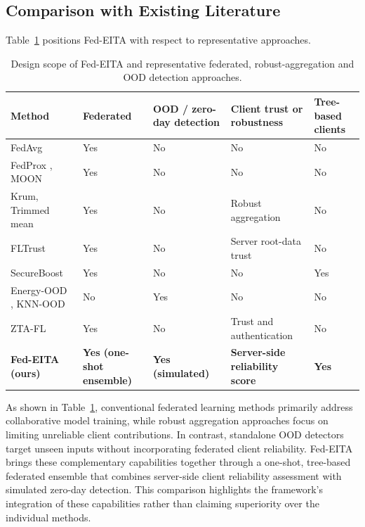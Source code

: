 \documentclass[pdflatex,sn-mathphys-num]{sn-jnl}
\begin{document}
{\subsection{Comparison with Existing Literature}
Table~\ref{tab:literature} positions Fed-EITA with respect to representative approaches. 

\begin{table}[!htbp]\centering
\color{black}
\caption{Design scope of Fed-EITA and representative federated, robust-aggregation and OOD detection approaches.}\label{tab:literature}
\footnotesize
\begin{tabular}{@{}>{\raggedright\arraybackslash}p{}>{\raggedright\arraybackslash}p{}>{\raggedright\arraybackslash}p{}>{\raggedright\arraybackslash}p{}>{\raggedright\arraybackslash}p{}@{}}\toprule
Method & Federated & OOD / zero-day detection & Client trust or robustness & Tree-based clients \\ \midrule
FedAvg \cite{mcmahan2017fedavg} & Yes & No & No & No \\
FedProx \cite{li2020fedprox}, MOON \cite{li2021moon} & Yes & No & No & No \\
Krum, Trimmed mean \cite{blanchard2017machine,yin2018byzantine} & Yes & No & Robust aggregation & No \\
FLTrust \cite{cao2021fltrust} & Yes & No & Server root-data trust & No \\
SecureBoost \cite{cheng2021secureboost} & Yes & No & No & Yes \\
Energy-OOD \cite{liu2020energy}, KNN-OOD \cite{sun2022knn} & No & Yes & No & No \\
ZTA-FL \cite{singh2025ztafl} & Yes & No & Trust and authentication & No \\
\textbf{Fed-EITA (ours)} & \textbf{Yes (one-shot ensemble)} & \textbf{Yes (simulated)} & \textbf{Server-side reliability score} & \textbf{Yes} \\
\bottomrule\end{tabular}
\end{table}
As shown in Table~\ref{tab:literature}, conventional federated learning methods primarily address collaborative model training, while robust aggregation approaches focus on limiting unreliable client contributions. In contrast, standalone OOD detectors target unseen inputs without incorporating federated client reliability. Fed-EITA brings these complementary capabilities together through a one-shot, tree-based federated ensemble that combines server-side client reliability assessment with simulated zero-day detection. This comparison highlights the framework's integration of these capabilities rather than claiming superiority over the individual methods.
}
\end{document}
